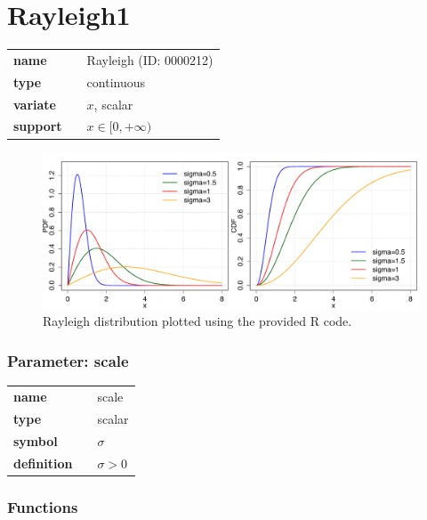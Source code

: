 \section*{Rayleigh1} 

  \bigskip 

\begin{tabular}{p{2cm}cl}
\textbf{name} & & Rayleigh (ID: 0000212)\\ 
 
\textbf{type} & & continuous \\ 

\textbf{variate} & & $x$, scalar \\ 

\textbf{support} & & $x \in [0,+\infty)$
\end{tabular}

\begin{figure}[ht!]
\centering
  \includegraphics[width=140mm]{pics/Rayleigh.pdf}
 \caption{Rayleigh distribution plotted using the provided R code.}
 \label{fig:Rayleigh}
\end{figure}

\subsubsection*{Parameter: scale}

\noindent\begin{tabular}{p{2cm}cl}
\textbf{name} & & scale \\
\textbf{type} & & scalar \\
\textbf{symbol} & & $\sigma$  \\
\textbf{definition} & & $\sigma > 0$
\end{tabular}
\subsubsection*{Functions}

